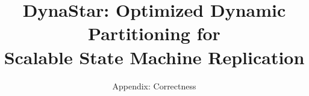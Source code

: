 \documentclass[svgnames,sigplan,10pt]{IEEEtran}
\newcommand{\dynastar}{\mbox{DynaStar}\xspace}
\begin{document}
\title{\dynastar: Optimized Dynamic Partitioning for\\ Scalable State Machine Replication}
\subtitle{Appendix: Correctness}
\date{}


\maketitle

% 



\end{document}
